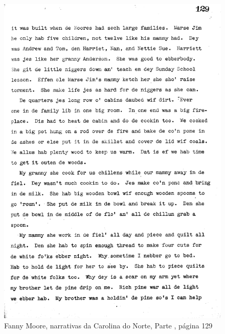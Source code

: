 \pagebreak
\thispagestyle{empty}
\movetoevenpage
\thispagestyle{empty}

\begin{absolutelynopagebreak}
\begin{vplace}
\begin{figure}[H]
\begin{adjustwidth}{-1.6cm}{}
  \vspace*{-2cm}
  \includegraphics[width=133mm]{./imgs/Cap4.jpg}  
\end{adjustwidth}
  \caption{Fanny Moore, narrativas da Carolina do Norte, Parte , página 129}
\end{figure}
\end{vplace}

\end{absolutelynopagebreak}

